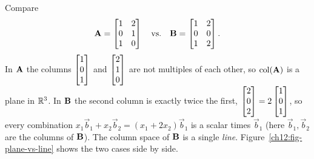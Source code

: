 \begin{example}\label{ch12:dependent-cols}
Compare
\[
  \mathbf{A} = \begin{bmatrix} 1 & 2 \\ 0 & 1 \\ 1 & 0 \end{bmatrix}
  \quad\text{vs.}\quad
  \mathbf{B} = \begin{bmatrix} 1 & 2 \\ 0 & 0 \\ 1 & 2 \end{bmatrix}.
\]
In $\mathbf{A}$ the columns $\begin{bmatrix}1\\0\\1\end{bmatrix}$ and $\begin{bmatrix}2\\1\\0\end{bmatrix}$ are not
multiples of each other, so $\operatorname{col}(\mathbf{A})$ is a plane in $\mathbb{R}^3$. In $\mathbf{B}$
the second column is exactly twice the first, $\begin{bmatrix}2\\0\\2\end{bmatrix} = 2\begin{bmatrix}1\\0\\1\end{bmatrix}$,
so every combination $x_1\vec{b}_1 + x_2\vec{b}_2 = (x_1+2x_2)\vec{b}_1$ is a
scalar times $\vec{b}_1$ (here $\vec{b}_1,\vec{b}_2$ are the columns of $\mathbf{B}$). The column space of $\mathbf{B}$ is a single \emph{line}.
Figure~\ref{ch12:fig-plane-vs-line} shows the two cases side by side.
\end{example}

